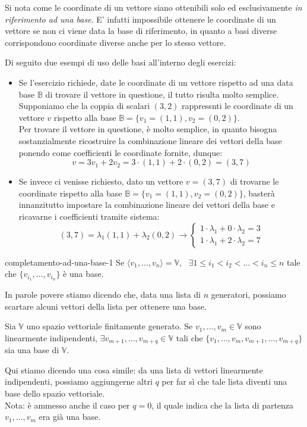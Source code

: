 \documentclass[12pt]{report}
\newcommand{\whitespace}{\text{ }}
\newcommand{\V}{\mathbb{V}}
\newcommand{\vectors}[1]{#1_1, \dots, #1_n}
\begin{document}
	Si nota come le coordinate di un vettore siano ottenibili solo ed esclusivamente \textit{in riferimento ad una base}. E' infatti impossibile ottenere le coordinate di un vettore se non ci viene data la base di riferimento, in quanto a basi diverse corrispondono coordinate diverse anche per lo stesso vettore.
	
	Di seguito due esempi di uso delle basi all'interno degli esercizi:
	\begin{itemize}
		\item Se l'esercizio richiede, date le coordinate di un vettore rispetto ad una data base $\mathbb{B}$ di trovare il vettore in questione, il tutto risulta molto semplice.\\
		Supponiamo che la coppia di scalari $(3, 2)$ rappressnti le coordinate di un vettore $v$ rispetto alla base $\mathbb{B} = \{v_1 = (1, 1), v_2 = (0, 2)\}$.\\
		Per trovare il vettore in questione, è molto semplice, in quanto bisogna sostanzialmente ricostruire la combinazione lineare dei vettori della base ponendo come coefficienti le coordinate fornite, dunque:
		\[
			v = 3v_1 + 2v_2 = 3 \cdot (1, 1) + 2 \cdot (0, 2) = (3, 7)
		\]
		\item Se invece ci venisse richiesto, dato un vettore $v = (3, 7)$ di trovarne le coordinate rispetto alla base $\mathbb{B} = \{v_1 = (1, 1), v_2 = (0, 2)\}$, basterà innanzitutto impostare la combinazione lineare dei vettori della base e ricavarne i coefficienti tramite sistema:
		\[
			(3, 7) = \lambda_1(1,1) + \lambda_2(0,2) \to
			\begin{cases}
				1 \cdot \lambda_1 + 0 \cdot \lambda_2 = 3\\
				1 \cdot \lambda_1 + 2 \cdot \lambda_2 = 7
			\end{cases}
		\]
	\end{itemize}
	
	\begin{proposizione}{}{completamento-ad-una-base-1}
		Se $\langle \vectors{v}\rangle = \V, \whitespace \exists 1 \leq i_1 < i_2 < \dots < i_n \leq n$ tale che $\{v_{i_1}, \dots, v_{i_n}\}$ è una base.
	\end{proposizione}
	In parole povere stiamo dicendo che, data una lista di $n$ generatori, possiamo scartare alcuni vettori della lista per ottenere una base.
	
	\begin{proposizione}{}{}
		Sia $\V$ uno spazio vettoriale finitamente generato. Se $v_1, \dots, v_m \in \V$ sono linearmente indipendenti, $\exists v_{m+1}, \dots, v_{m+q} \in \V$ tali che $\{v_1, \dots, v_m, v_{m+1}, \dots, v_{m+q}\}$ sia una base di $\V$.
	\end{proposizione}
	Qui stiamo dicendo una cosa simile: da una lista di vettori linearmente indipendenti, possiamo aggiungerne altri $q$ per far sì che tale lista diventi una base dello spazio vettoriale.\\
	Nota: è ammesso anche il caso per $q = 0$, il quale indica che la lista di partenza $v_1, \dots, v_m$ era già una base.
	
\end{document}

